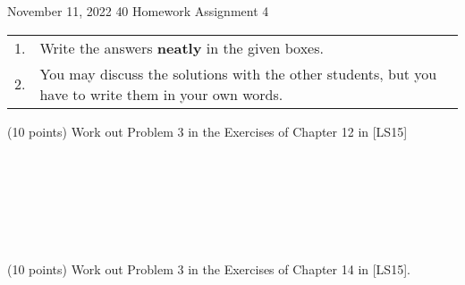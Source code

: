 \documentclass[a4paper, 12pt]{article}
\begin{document}
\vspace*{14ex}

           {November 11, 2022}      					         		%
					 {40}											%
					 {Homework Assignment 4}							%
					
\begin{tabular}{cl}
1. & Write the answers \textbf{neatly} in the given boxes.\\
2. & You may  discuss the solutions with the other students, but you have to write them in your own words.\\
\end{tabular}


\begin{problem}{}
(10 points) Work out Problem 3 in the Exercises of Chapter 12 in [LS15] \\ \\
\begin{minipage}{1\textwidth}
		\rectangle{\linewidth}{22cm}
\end{minipage}

\newpage
\ \\
\begin{minipage}{1\textwidth}
		\rectangle{\linewidth}{24cm}
\end{minipage}
\newpage
\ \\
\begin{minipage}{1\textwidth}
		\rectangle{\linewidth}{24cm}
\end{minipage}
\newpage
\ \\
\begin{minipage}{1\textwidth}
		\rectangle{\linewidth}{24cm}
\end{minipage}

\end{problem}


\newpage
\begin{problem}{}
(10 points) Work out Problem 3 in the Exercises of Chapter 14 in [LS15]. \\ \\
\begin{minipage}{1\textwidth}
		\rectangle{\linewidth}{23cm}
\end{minipage}
\newpage
\ \\
\begin{minipage}{1\textwidth}
		\rectangle{\linewidth}{24cm}
\end{minipage}
\newpage
\ \\
\begin{minipage}{1\textwidth}
		\rectangle{\linewidth}{24cm}
\end{minipage}
\newpage
\ \\
\begin{minipage}{1\textwidth}
		\rectangle{\linewidth}{24cm}
\end{minipage}
\end{problem}
\end{document}

